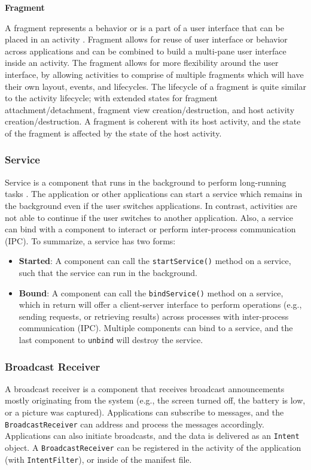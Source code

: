 \noindent \textbf{Fragment}

\noindent A fragment represents a behavior or is a part of a user interface that can be placed in an activity \cite{fragments}. Fragment allows for reuse of user interface or behavior across applications and can be combined to build a multi-pane user interface inside an activity. The fragment allows for more flexibility around the user interface, by allowing activities to comprise of multiple fragments which will have their own layout, events, and lifecycles. The lifecycle of a fragment is quite similar to the activity lifecycle; with extended states for fragment attachment/detachment, fragment view creation/destruction, and host activity creation/destruction. A fragment is coherent with its host activity, and the state of the fragment is affected by the state of the host activity. 

\subsubsection{Service}
Service is a component that runs in the background to perform long-running tasks \cite{services}. The application or other applications can start a service which remains in the background even if the user switches applications. In contrast, activities are not able to continue if the user switches to another application. Also, a service can bind with a component to interact or perform inter-process communication (IPC). To summarize, a service has two forms:
\begin{itemize}
    \item \textbf{Started}: A component can call the \verb|startService()| method on a service, such that the service can run in the background. 
    \item \textbf{Bound}: A component can call the \verb|bindService()| method on a service, which in return will offer a client-server interface to perform operations (e.g., sending requests, or retrieving results) across processes with inter-process communication (IPC). Multiple components can bind to a service, and the last component to \verb|unbind| will destroy the service. 
\end{itemize}

\subsubsection{Broadcast Receiver}
A broadcast receiver is a component that receives broadcast announcements mostly originating from the system (e.g., the screen turned off, the battery is low, or a picture was captured). Applications can subscribe to messages, and the \verb|BroadcastReceiver| can address and process the messages accordingly. Applications can also initiate broadcasts, and the data is delivered as an \verb|Intent| object. A \verb|BroadcastReceiver| can be registered in the activity of the application (with \verb|IntentFilter|), or inside of the manifest file. 

